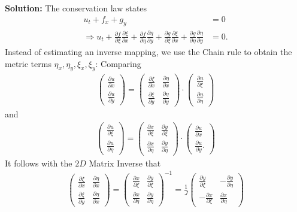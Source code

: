 \documentclass[11pt]{scrartcl}
\begin{document}
\textbf{Solution:}
The conservation law states 
\begin{align}
 u_t + f_x +g_y &= 0 \\
 \Rightarrow  u_t + \frac{\partial f}{\partial\xi} \frac{\partial\xi}{\partial x}+\frac{\partial f}{\partial \eta} \frac{\partial \eta}{\partial y} + \frac{\partial g}{\partial\xi} \frac{\partial\xi}{\partial x}+\frac{\partial g}{\partial\eta} \frac{\partial\eta}{\partial y} &= 0.
\label{contravariant1}
\end{align}
Instead of estimating an inverse mapping, we use the Chain rule to obtain the metric terms $\eta_x, \eta_y, \xi_x, \xi_y$: Comparing
\begin{align*}
\begin{pmatrix}
\frac{\partial u}{\partial x} \\
\frac{\partial u}{\partial y}
\end{pmatrix} =
\begin{pmatrix}
\frac{\partial \xi}{\partial x} & \frac{\partial \eta}{\partial x}\\
\frac{\partial \xi}{\partial y} & \frac{\partial \eta}{\partial y}
\end{pmatrix} \cdot
\begin{pmatrix}
\frac{\partial u}{\partial \xi} \\
\frac{\partial u}{\partial \eta}
\end{pmatrix}
\end{align*}
and 
\begin{align*}
\begin{pmatrix}
\frac{\partial u}{\partial \xi} \\
\frac{\partial u}{\partial \eta}
\end{pmatrix} =
\begin{pmatrix}
\frac{\partial x}{\partial \xi} & \frac{\partial y}{\partial \xi}\\
\frac{\partial x}{\partial \eta} & \frac{\partial y}{\partial \eta}
\end{pmatrix} \cdot
\begin{pmatrix}
\frac{\partial u}{\partial x} \\
\frac{\partial u}{\partial y}.
\end{pmatrix}
\end{align*}
It follows with the $2D$ Matrix Inverse that
\begin{align*}
\begin{pmatrix}
\frac{\partial \xi}{\partial x} & \frac{\partial \eta}{\partial x}\\
\frac{\partial \xi}{\partial y} & \frac{\partial \eta}{\partial x}
\end{pmatrix} =
\begin{pmatrix}
\frac{\partial x}{\partial \xi} & \frac{\partial y}{\partial \xi}\\
\frac{\partial x}{\partial \eta} & \frac{\partial y}{\partial \eta}
\end{pmatrix}^{-1} =
\frac{1}{J}
\begin{pmatrix}
\frac{\partial y}{\partial \xi} & -\frac{\partial y}{\partial \eta}\\
-\frac{\partial x}{\partial \xi} & \frac{\partial x}{\partial \eta}
\end{pmatrix}
\end{align*}
\end{document}

